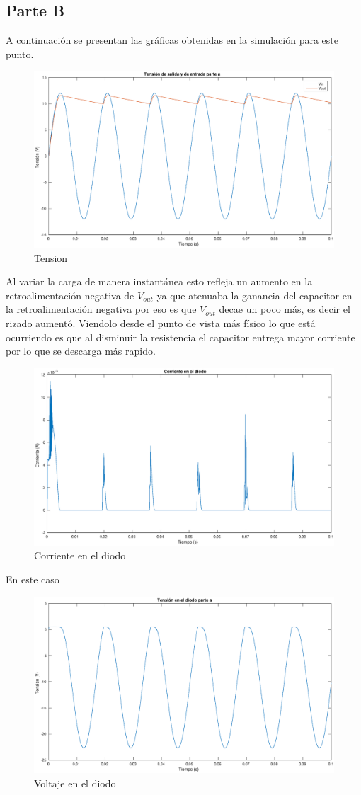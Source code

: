 \documentclass[12pt,letterpaper]{article}
\begin{document}
\subsection{Parte B}

A continuación se presentan las gráficas obtenidas en la simulación para este punto.

\begin{figure}[ht!]
  \centering
  \includegraphics[width=0.5\linewidth]{pictures/Ejercicio2_a_Vin_Vout.eps}
  \caption{Tension }
  \label{fig:2_a_Vin_Vout}
\end{figure}

Al variar la carga de manera instantánea esto refleja un aumento en la retroalimentación negativa de $V_{out}$ ya que atenuaba la ganancia del capacitor en la retroalimentación negativa por eso es que $V_{out}$ decae un poco más, es decir el rizado aumentó. Viendolo desde el punto de vista más físico lo que está ocurriendo es que al disminuir la resistencia el capacitor entrega mayor corriente por lo que se descarga más rapido.

\begin{figure}[ht!]
  \centering
  \includegraphics[width=0.5\linewidth]{pictures/Ejercicio2_a_corriente_diodo.eps}
  \caption{Corriente en el diodo}
  \label{fig:2_a_Id}
\end{figure}

En este caso

\begin{figure}[ht!]
  \centering
  \includegraphics[width=0.5\linewidth]{pictures/Ejercicio2_a_Vd.eps}
  \caption{Voltaje en el diodo}
  \label{fig:2_a_Vd}
\end{figure}
\end{document}
